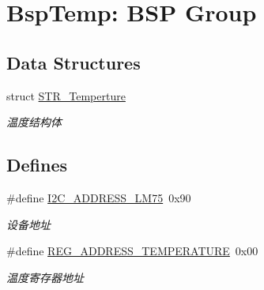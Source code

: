 \hypertarget{group___t_e_m_p}{\section{\-Bsp\-Temp\-: \-B\-S\-P \-Group}
\label{group___t_e_m_p}
}
\subsection*{\-Data \-Structures}
\begin{DoxyCompactItemize}
\item 
struct \hyperlink{struct_s_t_r___temperture}{\-S\-T\-R\-\_\-\-Temperture}
\begin{DoxyCompactList}\small\item\em 温度结构体 \end{DoxyCompactList}\end{DoxyCompactItemize}
\subsection*{\-Defines}
\begin{DoxyCompactItemize}
\item 
\hypertarget{group___t_e_m_p_gadb290c36c68a4bb03df896f80563ee3d}{\#define \hyperlink{group___t_e_m_p_gadb290c36c68a4bb03df896f80563ee3d}{\-I2\-C\-\_\-\-A\-D\-D\-R\-E\-S\-S\-\_\-\-L\-M75}~0x90}\label{group___t_e_m_p_gadb290c36c68a4bb03df896f80563ee3d}

\begin{DoxyCompactList}\small\item\em 设备地址 \end{DoxyCompactList}\item 
\hypertarget{group___t_e_m_p_ga43486373af16c49d9f843fc8d75e7beb}{\#define \hyperlink{group___t_e_m_p_ga43486373af16c49d9f843fc8d75e7beb}{\-R\-E\-G\-\_\-\-A\-D\-D\-R\-E\-S\-S\-\_\-\-T\-E\-M\-P\-E\-R\-A\-T\-U\-R\-E}~0x00}\label{group___t_e_m_p_ga43486373af16c49d9f843fc8d75e7beb}

\begin{DoxyCompactList}\small\item\em 温度寄存器地址 \end{DoxyCompactList}\end{DoxyCompactItemize}
